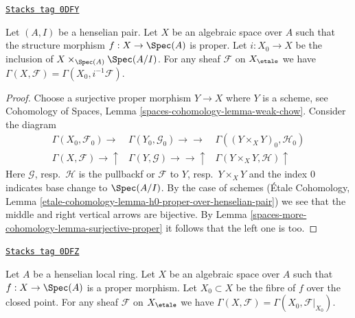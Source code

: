 \begin{lemma}
\label{spaces-more-cohomology-lemma-h0-proper-over-henselian-pair}
\href{https://stacks.math.columbia.edu/tag/0DFY}{\texttt{Stacks tag 0DFY}}

Let $(A, I)$ be a henselian pair. Let $X$ be an algebraic space over $A$
such that the structure morphism $f : X \to \Spec(A)$ is proper.
Let $i : X_0 \to X$ be the inclusion of $X \times_{\Spec(A)} \Spec(A/I)$.
For any sheaf $\mathcal{F}$ on $X_\etale$ we
have $\Gamma(X, \mathcal{F}) = \Gamma(X_0, i^{-1}\mathcal{F})$.
\end{lemma}

\begin{proof}
Choose a surjective proper morphism $Y \to X$ where $Y$ is a scheme, see
Cohomology of Spaces, Lemma \ref{spaces-cohomology-lemma-weak-chow}.
Consider the diagram
$$
\begin{array}{ccc}\Gamma(X_0, \mathcal{F}_0) \longrightarrow & \Gamma(Y_0, \mathcal{G}_0) \longrightarrow\longrightarrow & \Gamma((Y \times_X Y)_0, \mathcal{H}_0) \\ \Gamma(X, \mathcal{F}) \longrightarrow\uparrow & \Gamma(Y, \mathcal{G}) \longrightarrow\longrightarrow\uparrow & \Gamma(Y \times_X Y, \mathcal{H}) \uparrow\end{array}
$$
Here $\mathcal{G}$, resp.\ $\mathcal{H}$ is the pullbackf or
$\mathcal{F}$ to $Y$, resp.\ $Y \times_X Y$ and the index $0$
indicates base change to $\Spec(A/I)$. By the case of schemes
(\'Etale Cohomology, Lemma
\ref{etale-cohomology-lemma-h0-proper-over-henselian-pair})
we see that the middle and right vertical arrows are bijective.
By Lemma \ref{spaces-more-cohomology-lemma-surjective-proper} it follows that the left one is too.
\end{proof}

\begin{lemma}
\label{spaces-more-cohomology-lemma-h0-proper-over-henselian-local}
\href{https://stacks.math.columbia.edu/tag/0DFZ}{\texttt{Stacks tag 0DFZ}}

Let $A$ be a henselian local ring. Let $X$ be an algebraic space
over $A$ such that $f : X \to \Spec(A)$
is a proper morphism. Let $X_0 \subset X$ be the fibre of
$f$ over the closed point. For any sheaf $\mathcal{F}$ on $X_\etale$ we
have $\Gamma(X, \mathcal{F}) = \Gamma(X_0, \mathcal{F}|_{X_0})$.
\end{lemma}

